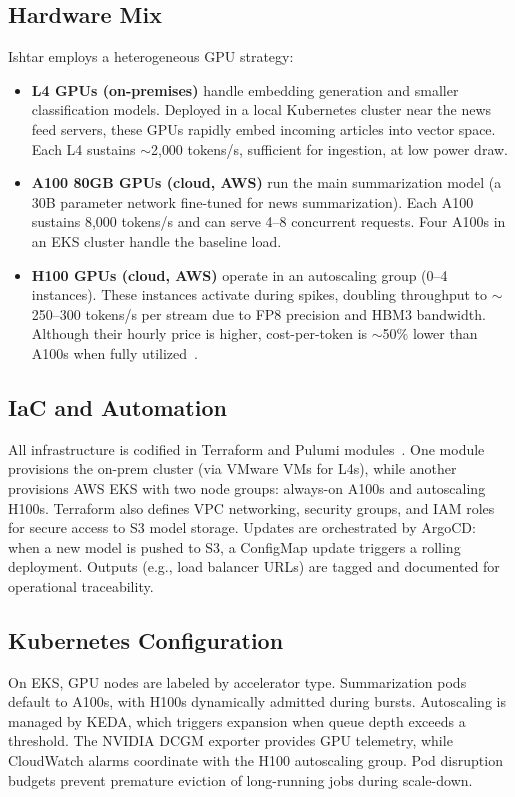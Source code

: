 \subsection{Hardware Mix}
Ishtar employs a heterogeneous GPU strategy:
\begin{itemize}
  \item \textbf{L4 GPUs (on-premises)} handle embedding generation and smaller classification models. Deployed in a local Kubernetes cluster near the news feed servers, these GPUs rapidly embed incoming articles into vector space. Each L4 sustains $\sim$2{,}000 tokens/s, sufficient for ingestion, at low power draw.
  \item \textbf{A100 80GB GPUs (cloud, AWS)} run the main summarization model (a 30B parameter network fine-tuned for news summarization). Each A100 sustains 8{,}000 tokens/s and can serve 4--8 concurrent requests. Four A100s in an EKS cluster handle the baseline load.
  \item \textbf{H100 GPUs (cloud, AWS)} operate in an autoscaling group (0–4 instances). These instances activate during spikes, doubling throughput to $\sim$250--300 tokens/s per stream due to FP8 precision and HBM3 bandwidth. Although their hourly price is higher, cost-per-token is $\sim$50\% lower than A100s when fully utilized~\cite{fabricatedknowledge,lambda}.
\end{itemize}

\subsection{IaC and Automation}
All infrastructure is codified in Terraform and Pulumi modules~\cite{terraform-docs,pulumi-docs}. One module provisions the on-prem cluster (via VMware VMs for L4s), while another provisions AWS EKS with two node groups: always-on A100s and autoscaling H100s. Terraform also defines VPC networking, security groups, and IAM roles for secure access to S3 model storage. Updates are orchestrated by ArgoCD: when a new model is pushed to S3, a ConfigMap update triggers a rolling deployment. Outputs (e.g., load balancer URLs) are tagged and documented for operational traceability.

\subsection{Kubernetes Configuration}
On EKS, GPU nodes are labeled by accelerator type. Summarization pods default to A100s, with H100s dynamically admitted during bursts. Autoscaling is managed by KEDA, which triggers expansion when queue depth exceeds a threshold. The NVIDIA DCGM exporter provides GPU telemetry, while CloudWatch alarms coordinate with the H100 autoscaling group. Pod disruption budgets prevent premature eviction of long-running jobs during scale-down.


